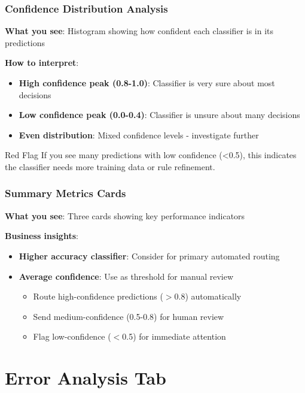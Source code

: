 \documentclass[11pt,a4paper]{article}
\begin{document}
\subsubsection{Confidence Distribution Analysis}
\textbf{What you see}: Histogram showing how confident each classifier is in its predictions

\textbf{How to interpret}:
\begin{itemize}
    \item \textbf{High confidence peak (0.8-1.0)}: Classifier is very sure about most decisions
    \item \textbf{Low confidence peak (0.0-0.4)}: Classifier is unsure about many decisions
    \item \textbf{Even distribution}: Mixed confidence levels - investigate further
\end{itemize}

\begin{warningbox}{Red Flag}
If you see many predictions with low confidence (<0.5), this indicates the classifier needs more training data or rule refinement.
\end{warningbox}

\subsubsection{Summary Metrics Cards}
\textbf{What you see}: Three cards showing key performance indicators

\textbf{Business insights}:
\begin{itemize}
    \item \textbf{Higher accuracy classifier}: Consider for primary automated routing
    \item \textbf{Average confidence}: Use as threshold for manual review
        \begin{itemize}
            \item Route high-confidence predictions ($>$0.8) automatically
            \item Send medium-confidence (0.5-0.8) for human review
            \item Flag low-confidence ($<$0.5) for immediate attention
        \end{itemize}
\end{itemize}

\section{Error Analysis Tab}
\end{document}
